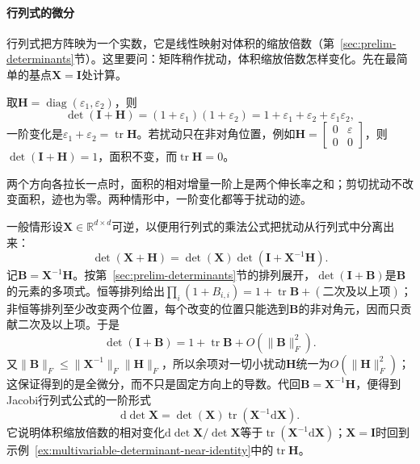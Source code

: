 \paragraph{行列式的微分}
行列式把方阵映为一个实数，它是线性映射对体积的缩放倍数（第~\ref{sec:prelim-determinants}节）。这里要问：矩阵稍作扰动，体积缩放倍数怎样变化。先在最简单的基点$\bm X=\bm I$处计算。
\begin{example}[单位矩阵附近行列式的一阶变化]
\label{ex:multivariable-determinant-near-identity}
取$\bm H=\operatorname{diag}(\varepsilon_1,\varepsilon_2)$，则
\[
 \det(\bm I+\bm H)=(1+\varepsilon_1)(1+\varepsilon_2)=1+\varepsilon_1+\varepsilon_2+\varepsilon_1\varepsilon_2,
\]
一阶变化是$\varepsilon_1+\varepsilon_2=\operatorname{tr}\bm H$。若扰动只在非对角位置，例如$\bm H=\begin{bmatrix}0&\varepsilon\\0&0\end{bmatrix}$，则$\det(\bm I+\bm H)=1$，面积不变，而$\operatorname{tr}\bm H=0$。
\end{example}

两个方向各拉长一点时，面积的相对增量一阶上是两个伸长率之和；剪切扰动不改变面积，迹也为零。两种情形中，一阶变化都等于扰动的迹。

一般情形设$\bm X\in\mathbb R^{d\times d}$可逆，以便用行列式的乘法公式把扰动从行列式中分离出来：
\[
 \det(\bm X+\bm H)=\det(\bm X)\det(\bm I+\bm X^{-1}\bm H).
\]
记$\bm B=\bm X^{-1}\bm H$。按第~\ref{sec:prelim-determinants}节的排列展开，$\det(\bm I+\bm B)$是$\bm B$的元素的多项式。恒等排列给出$\prod_i(1+B_{i,i})=1+\operatorname{tr}\bm B+(\text{二次及以上项})$；非恒等排列至少改变两个位置，每个改变的位置只能选到$\bm B$的非对角元，因而只贡献二次及以上项。于是
\[
 \det(\bm I+\bm B)=1+\operatorname{tr}\bm B+O(\lVert\bm B\rVert_F^2).
\]
又$\lVert\bm B\rVert_F\leq\lVert\bm X^{-1}\rVert_F\lVert\bm H\rVert_F$，所以余项对一切小扰动$\bm H$统一为$O(\lVert\bm H\rVert_F^2)$；这保证得到的是全微分，而不只是固定方向上的导数。代回$\bm B=\bm X^{-1}\bm H$，便得到Jacobi行列式公式的一阶形式
\[
 \mathrm{d}\det\bm{X}=\det(\bm{X})\operatorname{tr}(\bm{X}^{-1}\mathrm{d}\bm{X}).
\]
它说明体积缩放倍数的相对变化$\mathrm d\det\bm X/\det\bm X$等于$\operatorname{tr}(\bm X^{-1}\mathrm d\bm X)$；$\bm X=\bm I$时回到示例~\ref{ex:multivariable-determinant-near-identity}中的$\operatorname{tr}\bm H$。

